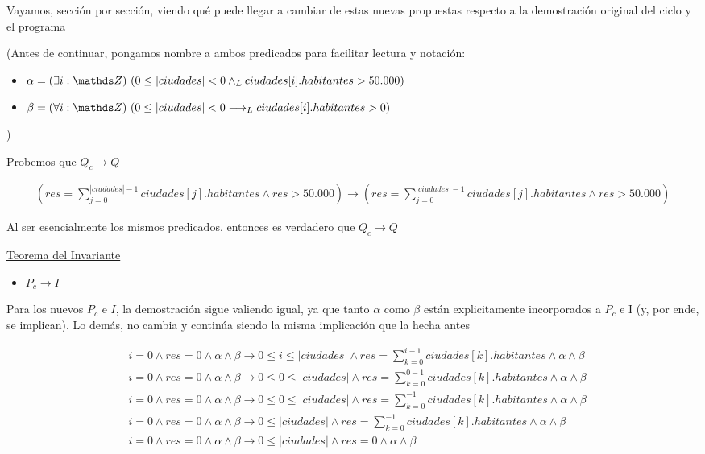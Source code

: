 \documentclass[10pt,a4paper]{article}
\begin{document}
\begin {enumerate}
    
    
    Vayamos, sección por sección, viendo qué puede llegar a cambiar de estas nuevas propuestas respecto a la demostración original del ciclo y el programa

    (Antes de continuar, pongamos nombre a ambos predicados para facilitar lectura y notación: 
    \begin{itemize}
    \item$\alpha =  \existe[unalinea]{i}{\ent}{0 \leq |ciudades| < 0\yLuego ciudades[i].habitantes > 50.000}$ \\
    \item$ \beta = \paraTodo[unalinea]{i}{\ent}{0 \leq |ciudades| < 0\implicaLuego ciudades[i].habitantes > 0}$
    \end{itemize}
    )

    Probemos que $Q_{c} \to Q$

    \begin{align*}
      (res = \sum\limits^{|ciudades| - 1}_{j = 0}{ciudades[j].habitantes} \land res > 50.000) \to ( res = \sum\limits^{|ciudades| - 1}_{j = 0}{ciudades[j].habitantes} \land res > 50.000)
    \end{align*}

    Al ser esencialmente los mismos predicados, entonces es verdadero que $Q_{c} \to Q$


    \underline{Teorema del Invariante}

    \begin{itemize}
        \item $P_{c} \to I$
    \end{itemize}

    Para los nuevos $P_{c}$ e $I$, la demostración sigue valiendo igual, ya que tanto $\alpha$ como $\beta$ están explicitamente incorporados a 
    $P_{c}$ e I (y, por ende, se implican). Lo demás, no cambia y continúa siendo la misma implicación que la hecha antes

    \begin{align*}
        &i = 0 \land res = 0 \land \alpha \land \beta \to 0 \leq i \leq |ciudades| \land res = \sum\limits_{k=0}^{i - 1}{ciudades[k].habitantes} \land \alpha \land \beta\\
        &i = 0 \land res = 0 \land \alpha \land \beta \to 0 \leq 0 \leq |ciudades| \land res = \sum\limits_{k=0}^{0 - 1}{ciudades[k].habitantes}  \land \alpha \land \beta\\
        &i = 0 \land res = 0 \land \alpha \land \beta \to 0 \leq 0 \leq |ciudades| \land res = \sum\limits_{k=0}^{-1}{ciudades[k].habitantes} \land \alpha \land \beta \\
        &i = 0 \land res = 0 \land \alpha \land \beta \to  0 \leq |ciudades| \land res = \sum\limits_{k=0}^{-1}{ciudades[k].habitantes} \land \alpha \land \beta \\
        &i = 0 \land res = 0 \land \alpha \land \beta \to  0 \leq |ciudades| \land res = 0 \land \alpha \land \beta \\
    \end{align*}


\end{enumerate}
\end{document}
